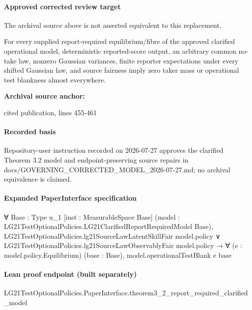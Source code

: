 \documentclass[10pt]{article}
\begin{document}
\paragraph{Approved corrected review target}
The archival source above is not asserted equivalent to this replacement.
\begin{ReviewVerbatim}
For every supplied report-required equilibrium/fibre of the approved clarified operational model, deterministic reported-score output, an arbitrary common no-take law, nonzero Gaussian variances, finite reporter expectations under every shifted Gaussian law, and source fairness imply zero taker mass or operational test blankness almost everywhere.
\end{ReviewVerbatim}

\textbf{Archival source anchor:} {\footnotesize\raggedright cited publication, lines 455-\allowbreak{}461\par}
\paragraph{Recorded basis}
Repository-\allowbreak{}user instruction recorded on 2026-\allowbreak{}07-\allowbreak{}27 approves the clarified Theorem 3.\allowbreak{}2 model and endpoint-\allowbreak{}preserving source repairs in docs/\allowbreak{}GOVERNING\_\allowbreak{}CORRECTED\_\allowbreak{}MODEL\_\allowbreak{}2026-\allowbreak{}07-\allowbreak{}27.\allowbreak{}md;\allowbreak{} no archival equivalence is claimed.\allowbreak{}
\paragraph{Expanded PaperInterface specification}
\begin{ReviewVerbatim}
∀ {Base : Type u_1} [inst : MeasurableSpace Base]
  (model : LG21TestOptionalPolicies.LG21ClarifiedReportRequiredModel Base),
  LG21TestOptionalPolicies.lg21SourceLawLatentSkillFair model.policy ∨
      LG21TestOptionalPolicies.lg21SourceLawObservablyFair model.policy →
    ∀ (e : model.policy.Equilibrium) (base : Base), model.operationalTestBlank e base
\end{ReviewVerbatim}

\paragraph{Lean proof endpoint (built separately)}\begin{ReviewVerbatim}
LG21TestOptionalPolicies.PaperInterface.theorem3_2_report_required_clarified_model
\end{ReviewVerbatim}
\end{document}

